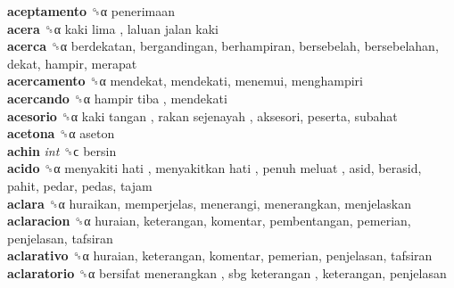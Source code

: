 \textbf{aceptamento} ␝α  penerimaan  \\
\textbf{acera} ␝α   kaki lima ,  laluan jalan kaki   \\
\textbf{acerca} ␝α  berdekatan, bergandingan, berhampiran, bersebelah, bersebelahan, dekat, hampir, merapat  \\
\textbf{acercamento} ␝α  mendekat, mendekati, menemui, menghampiri  \\
\textbf{acercando} ␝α   hampir tiba , mendekati  \\
\textbf{acesorio} ␝α   kaki tangan ,  rakan sejenayah , aksesori, peserta, subahat  \\
\textbf{acetona} ␝α  aseton  \\
\textbf{achin} \emph{int}  ␝ϲ  bersin  \\
\textbf{acido} ␝α   menyakiti hati ,  menyakitkan hati ,  penuh meluat , asid, berasid, pahit, pedar, pedas, tajam  \\
\textbf{aclara} ␝α  huraikan, memperjelas, menerangi, menerangkan, menjelaskan  \\
\textbf{aclaracion} ␝α  huraian, keterangan, komentar, pembentangan, pemerian, penjelasan, tafsiran  \\
\textbf{aclarativo} ␝α  huraian, keterangan, komentar, pemerian, penjelasan, tafsiran  \\
\textbf{aclaratorio} ␝α   bersifat menerangkan ,  sbg keterangan , keterangan, penjelasan  \\

